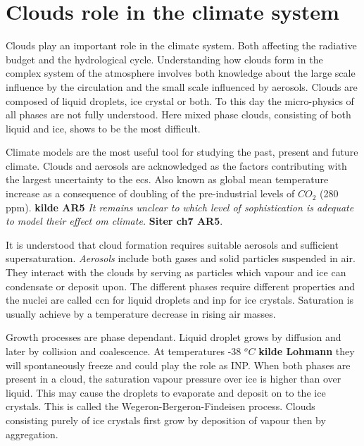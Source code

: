 \section{Clouds role in the climate system} \label{sec:cloud_in_climate_system}
Clouds play an important role in the climate system. Both affecting the radiative budget and the hydrological cycle. Understanding how clouds form in the complex system of the atmosphere involves both knowledge about the large scale influence by the circulation and the small scale influenced by aerosols. Clouds are composed of liquid droplets, ice crystal or both. To this day the micro-physics of all phases are not fully understood. Here mixed phase clouds, consisting of both liquid and ice, shows to be the most difficult. 

Climate models are the most useful tool for studying the past, present and future climate. Clouds and aerosols are acknowledged as the factors contributing with the largest uncertainty to the \acrfull{ecs}. Also known as global mean temperature increase as a consequence of doubling of the pre-industrial levels of $CO_2$ (280 \acrshort{ppm}). \textbf{kilde AR5} \textit{It remains unclear to which level of sophistication is adequate to model their effect om climate.} \textbf{Siter ch7 AR5}.

It is understood that cloud formation requires suitable aerosols and sufficient supersaturation. \textit{Aerosols} include both gases and solid particles suspended in air. They interact with the clouds by serving as particles which vapour and ice can condensate or deposit upon. The different phases require different properties and the nuclei are called \acrshort{ccn} for liquid droplets and \acrshort{inp} for ice crystals. Saturation is usually achieve by a temperature decrease in rising air masses. %
 
Growth processes are phase dependant. Liquid droplet grows by diffusion and later by collision and coalescence. At temperatures -38 $^oC$ \textbf{kilde Lohmann} they will spontaneously freeze and could play the role as INP. When both phases are present in a cloud, the saturation vapour pressure over ice is higher than over liquid. This may cause the droplets to evaporate and deposit on to the ice crystals. This is called the Wegeron-Bergeron-Findeisen process. Clouds consisting purely of ice crystals first grow by deposition of vapour then by aggregation. 

